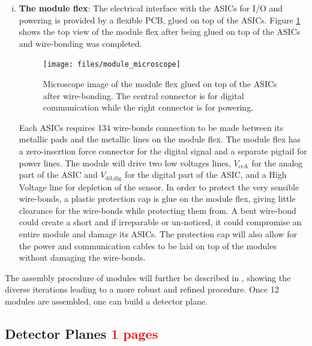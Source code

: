 \begin{enumerate}[i)]
			\item \textbf{The module flex}: The electrical interface with the ASICs for I/O and powering is provided by a flexible PCB, glued on top of the ASICs. Figure \ref{im:module_microscope} shows the top view of the module flex after being glued on top of the ASICs and wire-bonding was completed. 
			\begin{figure}[h]
				\centering
				\texttt{[image: files/module\_microscope]}
				\caption{Microscope image of the module flex glued on top of the ASICs after wire-bonding. The central connector is for digital communication while the right connector is for powering.}
				\label{im:module_microscope}
			\end{figure} 
		
			 Each ASICs requires 134 wire-bonds connection to be made between its metallic pads and the metallic lines on the module flex. The module flex has a zero-insertion force connector for the digital signal and a separate pigtail for power lines. The module will drive two low voltages lines, $V_{\text{ccA}}$ for the analog part of the ASIC and $V_{\text{dd,dig}}$ for the digital part of the ASIC, and a High Voltage line for depletion of the sensor\cite{PreShower_TP}. In order to protect the very sensible wire-bonds, a plastic protection cap is glue on the module flex, giving little clearance for the wire-bonds while protecting them from. A bent wire-bond could create a short and if irreparable or un-noticed, it could compromise an entire module and damage its ASICs. The protection cap will also allow for the power and communication cables to be laid on top of the modules without damaging the wire-bonds.  
		\end{enumerate} 
		
		The assembly procedure of modules will further be described in , showing the diverse iterations leading to a more robust and refined procedure. Once 12 modules are assembled, one can build a detector plane. 
		
		
		
		
		
		
		\subsection{Detector Planes \textcolor{red}{ 1 pages}}
		
